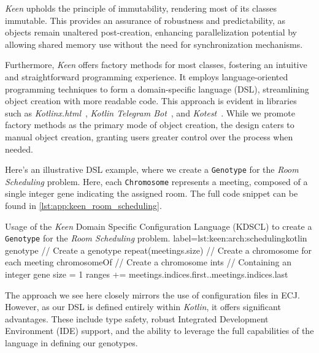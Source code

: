   \textit{Keen} upholds the principle of immutability, rendering most of its
  classes immutable.
  This provides an assurance of robustness and predictability, as objects remain
  unaltered post-creation, enhancing parallelization potential by allowing
  shared memory use without the need for synchronization mechanisms.

  Furthermore, \textit{Keen} offers factory methods for most classes, fostering 
  an intuitive and straightforward programming experience.
  It employs language-oriented programming techniques to form a domain-specific 
  language (DSL), streamlining object creation with more readable code.
  This approach is evident in libraries such as 
  \textit{Kotlinx.html}~\autocite{KotlinxHtml2023}, 
  \textit{Kotlin Telegram Bot}~\autocite{KotlinTelegramBot2023}, and 
  \textit{Kotest}~\autocite{KotestKotesta}.
  While we promote factory methods as the primary mode of object creation, the 
  design caters to manual object creation, granting users greater control over 
  the process when needed.


  Here's an illustrative DSL example, where we create a \texttt{Genotype} for
  the \textit{Room Scheduling} problem.
  Here, each \texttt{Chromosome} represents a meeting, composed of a single
  integer gene indicating the assigned room. The full code snippet can be found 
  in \vref{lst:app:keen_room_scheduling}.

  \begin{code}{
      Usage of the \textit{Keen} Domain Specific Configuration Language 
      (KDSCL) to create a \texttt{Genotype} for the \textit{Room
      Scheduling} problem.
  }{label={lst:keen:arch:scheduling}}{kotlin}
    genotype {                  // Create a genotype
        repeat(meetings.size) { // Create a chromosome for each meeting
            chromosomeOf {      // Create a chromosome
                ints {          // Containing an integer gene
                    size = 1    
                    ranges += meetings.indices.first..meetings.indices.last
                }
            }
        }
    }
  \end{code}

  The approach we see here closely mirrors the use of configuration files in 
  ECJ.
  However, as our DSL is defined entirely within \textit{Kotlin}, it offers 
  significant advantages.
  These include type safety, robust Integrated Development Environment (IDE) 
  support, and the ability to leverage the full capabilities of the language 
  in defining our genotypes.

